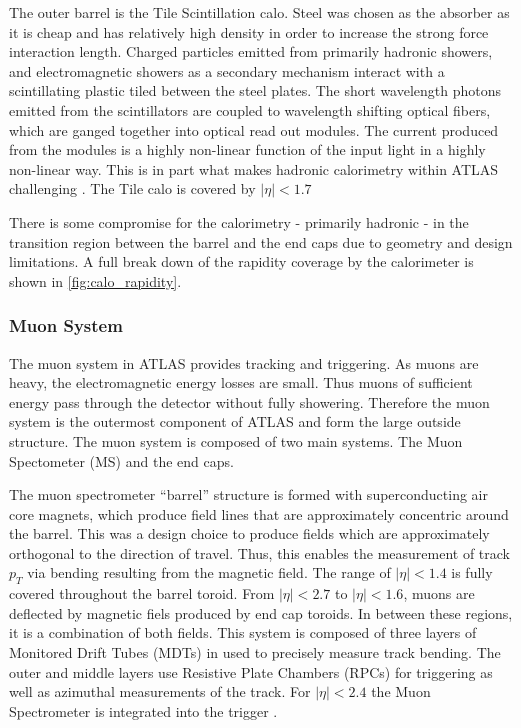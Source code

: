 \documentclass[12pt]{article}
\begin{document}
The outer barrel is the Tile Scintillation calo. Steel was chosen as the
absorber as it is cheap and has relatively high density in order to increase the
strong force interaction length. Charged particles emitted from primarily
hadronic showers, and electromagnetic showers as a secondary mechanism interact
with a scintillating plastic tiled between the steel plates. The short
wavelength photons emitted from the scintillators are coupled to wavelength
shifting optical fibers, which are ganged together into optical read out
modules. The current produced from the modules is a highly non-linear function
of the input light in a highly non-linear way. This is in part what makes
hadronic calorimetry within ATLAS challenging
\cite{The_ATLAS_Collaboration_2008, ml4p}. The Tile calo is covered by
$|\eta|<1.7$

There is some compromise for the calorimetry - primarily hadronic - in the
transition region between the barrel and the end caps due to geometry and design
limitations. A full break down of the rapidity coverage by the calorimeter is
shown in \ref{fig:calo_rapidity}.

\subsubsection{Muon System}

The muon system in ATLAS provides tracking and triggering. As
muons are heavy, the electromagnetic energy losses are small. Thus muons of
sufficient energy pass through the detector without fully showering. Therefore
the muon system is the outermost component of ATLAS and form the large outside
structure. The muon system is composed of two main systems. The Muon Spectometer
(MS) and the end caps. 

The muon spectrometer ``barrel'' structure is formed with
superconducting air core magnets, which produce field lines that are
approximately concentric around the barrel. This was a design choice to produce
fields which are approximately orthogonal to the direction of travel. Thus, this
enables the measurement of track $p_T$ via bending resulting from the magnetic
field. The range of $|\eta|<1.4$ is fully covered throughout the barrel toroid.
From $|\eta| < 2.7$ to $|\eta| < 1.6$, muons are deflected by magnetic fiels
produced by end cap toroids. In between these regions, it is a combination of
both fields. This system is composed of three layers of Monitored Drift Tubes (MDTs) in
used to precisely measure track bending. The outer and middle layers use
Resistive Plate Chambers (RPCs) for triggering as well as azimuthal measurements
of the track. For $|\eta|<2.4$ the Muon Spectrometer is integrated into the
trigger \cite{Aad_2024}.
\end{document}
